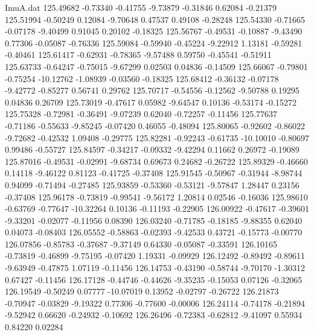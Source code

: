 \begin{filecontents}{ImuA.dat}
 125.49682   -0.73340   -0.41755   -9.73879   -0.31846    0.62084   -0.21379
 125.51994   -0.50249    0.12084   -9.70648    0.47537    0.49108   -0.28248
 125.54330   -0.71665   -0.07178   -9.40499    0.91045    0.20102   -0.18325
 125.56767   -0.49531   -0.10887   -9.43490    0.77306   -0.05087   -0.76336
 125.59084   -0.59940   -0.45224   -9.22912    1.13181   -0.59281   -0.40461
 125.61417   -0.62931   -0.78365   -9.57488    0.59750   -0.45541   -0.51911
 125.63733   -0.64247   -0.75015   -9.67299    0.02503    0.04836   -0.14509
 125.66067   -0.79801   -0.75254  -10.12762   -1.08939   -0.03560   -0.18325
 125.68412   -0.36132   -0.07178   -9.42772   -0.85277    0.56741    0.29762
 125.70717   -0.54556   -0.12562   -9.50788    0.19295    0.04836    0.26709
 125.73019   -0.47617    0.05982   -9.64547    0.10136   -0.53174   -0.15272
 125.75328   -0.72981   -0.36491   -9.07239    0.62040   -0.72257   -0.11456
 125.77637   -0.71186   -0.55633   -9.85245   -0.07420    0.46055   -0.48094
 125.80065   -0.92602   -0.86022   -9.72682   -0.42532    1.09408   -0.29775
 125.82281   -0.92243   -0.61735  -10.10010   -0.80697    0.99486   -0.55727
 125.84597   -0.34217   -0.09332   -9.42294    0.11662    0.26972   -0.19089
 125.87016   -0.49531   -0.02991   -9.68734    0.69673    0.24682   -0.26722
 125.89329   -0.46660    0.14118   -9.46122    0.81123   -0.41725   -0.37408
 125.91545   -0.50967   -0.31944   -8.98744    0.94099   -0.71494   -0.27485
 125.93859   -0.53360   -0.53121   -9.57847    1.28447    0.23156   -0.37408
 125.96178   -0.73819   -0.99541   -9.56172    1.20814    0.02546   -0.16036
 125.98610   -0.63769   -0.77647  -10.32264    0.10136   -0.11193   -0.22905
 126.00922   -0.47617   -0.39601   -9.33201   -0.02077   -0.11956    0.08390
 126.03240   -0.71785   -0.18185   -9.88355    0.62040    0.04073   -0.08403
 126.05552   -0.58863   -0.02393   -9.42533    0.43721   -0.15773   -0.00770
 126.07856   -0.85783   -0.37687   -9.37149    0.64330   -0.05087   -0.33591
 126.10165   -0.73819   -0.46899   -9.75195   -0.07420    1.19331   -0.09929
 126.12492   -0.89492   -0.89611   -9.63949   -0.47875    1.07119   -0.11456
 126.14753   -0.43190   -0.58744   -9.70170   -1.30312    0.67427   -0.11456
 126.17128   -0.44746   -0.44626   -9.35235   -0.15053    0.07126   -0.32065
 126.19549   -0.50249    0.07777  -10.07019    0.13952   -0.02797   -0.26722
 126.21873   -0.70947   -0.03829   -9.19322    0.77306   -0.77600   -0.00006
 126.24114   -0.74178   -0.21894   -9.52942    0.66620   -0.24932   -0.10692
 126.26496   -0.72383   -0.62812   -9.41097    0.55934    0.84220    0.02284

\end{filecontents}
